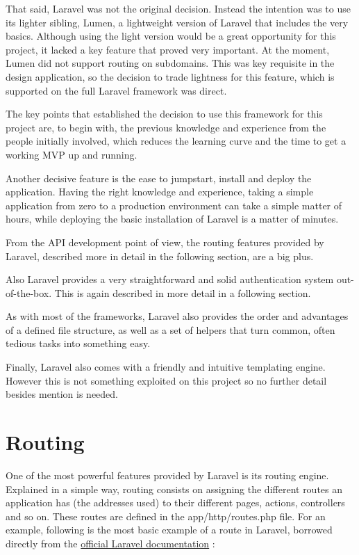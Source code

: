 That said, Laravel was not the original decision. Instead the intention was to use its lighter sibling, Lumen, a lightweight version of Laravel that includes the very basics. Although using the light version would be a great opportunity for this project, it lacked a key feature that proved very important. At the moment, Lumen did not support routing on subdomains. This was key requisite in the design application, so the decision to trade lightness for this feature, which is supported on the full Laravel framework was direct.

The key points that established the decision to use this framework for this project are, to begin with, the previous knowledge and experience from the people initially involved, which reduces the learning curve and the time to get a working MVP up and running.

Another decisive feature is the ease to jumpstart, install and deploy the application. Having the right knowledge and experience, taking a simple application from zero to a production environment can take a simple matter of hours, while deploying the basic installation of Laravel is a matter of minutes.

From the API development point of view, the routing features provided by Laravel, described more in detail in the following section, are a big plus.

Also Laravel provides a very straightforward and solid authentication system out-of-the-box. This is again described in more detail in a following section.

As with most of the frameworks, Laravel also provides the order and advantages of a defined file structure, as well as a set of helpers that turn common, often tedious tasks into something easy.

Finally, Laravel also comes with a friendly and intuitive templating engine. However this is not something exploited on this project so no further detail besides mention is needed.

\section{Routing}
One of the most powerful features provided by Laravel is its routing engine. Explained in a simple way, routing consists on assigning the different routes an application has (the addresses used) to their different pages, actions, controllers and so on. These routes are defined in the app/http/routes.php file. For an example, following is the most basic example of a route in Laravel, borrowed directly from the \href{https://laravel.com/docs/5.3/routing}{official Laravel documentation} \cite{9}:

